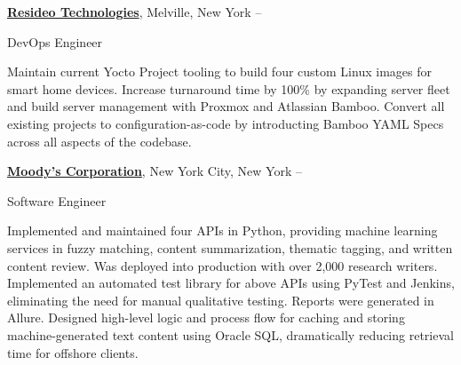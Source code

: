 \documentclass[letterpaper,MMMyyyy,nonstopmode]{simpleresumecv}
\begin{document}
\begin{Body}
\BigGap
\Entry
\href{https://resideo.com/}
{\textbf{Resideo Technologies}},
Melville, New York
\hfill
{} --

\Gap
\BulletItem
DevOps Engineer
\begin{Detail}
\SubBulletItem
Maintain current Yocto Project tooling to build four custom Linux images for smart home devices.
\SubBulletItem
Increase turnaround time by 100\% by expanding server fleet and build server management with Proxmox and Atlassian Bamboo.
\SubBulletItem
Convert all existing projects to configuration-as-code by introducting Bamboo YAML Specs across all aspects of the codebase.
\end{Detail}

%



\BigGap
\Entry
\href{http://www.moodys.com}
{\textbf{Moody's Corporation}},
New York City, New York
\hfill
{} --

\Gap
\BulletItem
Software Engineer
\begin{Detail}
\SubBulletItem
Implemented and maintained four APIs in Python, providing machine learning services in fuzzy matching, content summarization, thematic tagging, and written content review. Was deployed into production with over 2,000 research writers.
\SubBulletItem
Implemented an automated test library for above APIs using PyTest and Jenkins, eliminating the need for manual qualitative testing. Reports were generated in Allure.
\SubBulletItem
Designed high-level logic and process flow for caching and storing machine-generated text content using Oracle SQL, dramatically reducing retrieval time for offshore clients.
\end{Detail}


\end{Body}
\end{document}
